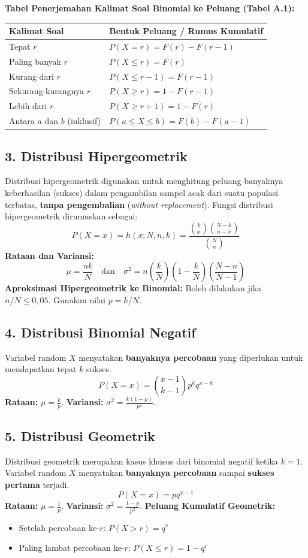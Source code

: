 \documentclass[12pt, a4paper]{article}
\begin{document}
\textbf{Tabel Penerjemahan Kalimat Soal Binomial ke Peluang (Tabel A.1):}
\begin{table}[h!]
\centering
\begin{tabular}{|l|l|}
\hline
\textbf{Kalimat Soal} & \textbf{Bentuk Peluang / Rumus Kumulatif} \\ \hline
Tepat $r$ & $P(X=r) = F(r) - F(r-1)$ \\ \hline
Paling banyak $r$ & $P(X \le r) = F(r)$ \\ \hline
Kurang dari $r$ & $P(X \le r-1) = F(r-1)$ \\ \hline
Sekurang-kurangnya $r$ & $P(X \ge r) = 1 - F(r-1)$ \\ \hline
Lebih dari $r$ & $P(X \ge r+1) = 1 - F(r)$ \\ \hline
Antara $a$ dan $b$ (inklusif) & $P(a \le X \le b) = F(b) - F(a-1)$ \\ \hline
\end{tabular}
\end{table}

\subsection{3. Distribusi Hipergeometrik}
Distribusi hipergeometrik digunakan untuk menghitung peluang banyaknya keberhasilan (sukses) dalam pengambilan sampel acak dari suatu populasi terbatas, \textbf{tanpa pengembalian} (\textit{without replacement}). 
Fungsi distribusi hipergeometrik dirumuskan sebagai:
$$P(X=x) = h(x; N, n, k) = \frac{\binom{k}{x}\binom{N-k}{n-x}}{\binom{N}{n}}$$
\textbf{Rataan dan Variansi:}
$$\mu = \frac{nk}{N} \quad \text{dan} \quad \sigma^2 = n\left(\frac{k}{N}\right)\left(1-\frac{k}{N}\right)\left(\frac{N-n}{N-1}\right)$$
\textbf{Aproksimasi Hipergeometrik ke Binomial:} Boleh dilakukan jika $n/N \le 0{,}05$. Gunakan nilai $p = k/N$.

\subsection{4. Distribusi Binomial Negatif}
Variabel random $X$ menyatakan \textbf{banyaknya percobaan} yang diperlukan untuk mendapatkan tepat $k$ sukses.
$$P(X=x) = \binom{x-1}{k-1} p^k q^{x-k}$$
\textbf{Rataan:} $\mu = \frac{k}{p}$. \textbf{Variansi:} $\sigma^2 = \frac{k(1-p)}{p^2}$.

\subsection{5. Distribusi Geometrik}
Distribusi geometrik merupakan kasus khusus dari binomial negatif ketika $k=1$. Variabel random $X$ menyatakan \textbf{banyaknya percobaan} sampai \textbf{sukses pertama} terjadi.
$$P(X=x) = p q^{x-1}$$
\textbf{Rataan:} $\mu = \frac{1}{p}$. \textbf{Variansi:} $\sigma^2 = \frac{1-p}{p^2}$.
\textbf{Peluang Kumulatif Geometrik:}
\begin{itemize}
    \item Setelah percobaan ke-$r$: $P(X>r) = q^r$
    \item Paling lambat percobaan ke-$r$: $P(X \le r) = 1 - q^r$
\end{itemize}
\end{document}
